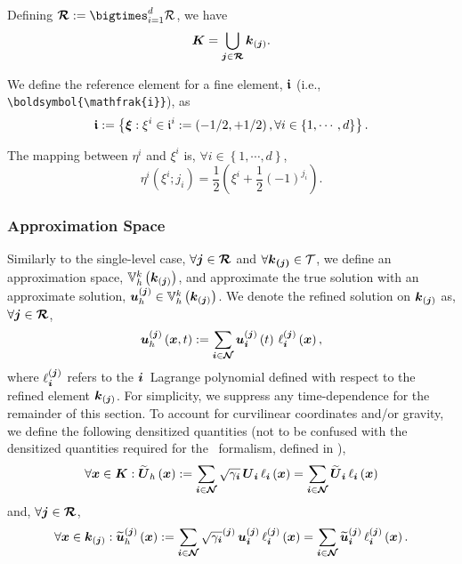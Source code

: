 Defining $\bc{R}:=\bigtimes_{i=1}^{d}\mc{R}$,
we have
\begin{equation}
  \boldsymbol{K}=\bigcup\limits_{\boldsymbol{j}\in\boldsymbol{\mathcal{R}}}
  \boldsymbol{k}_{\left(\boldsymbol{j}\right)}.
\end{equation}

We define the reference element for a fine element,
$\boldsymbol{\mathfrak{i}}$ (i.e., \verb"\boldsymbol{\mathfrak{i}}"), as
\begin{equation}
  \boldsymbol{\mathfrak{i}}
  :=\left\{\boldsymbol{\xi}:\xi^{i}\in\mathfrak{i}^{i}
  :=\left(-1/2,+1/2\right),\forall i\in\left\{1,\cdots,d\right\}\right\}.
\end{equation}

The mapping between $\eta^{i}$ and $\xi^{i}$ is,
$\forall i\in\left\{1,\cdots,d\right\}$,
\begin{equation}
  \eta^{i}\left(\xi^{i};j_{i}\right)
  =\frac{1}{2}\left(\xi^{i}+\frac{1}{2}\left(-1\right)^{j_{i}}\right).
\end{equation}

\subsubsection{Approximation Space}

Similarly to the single-level case,
$\forall \boldsymbol{j}\in\boldsymbol{\mathcal{R}}$
and $\forall\boldsymbol{\boldsymbol{k}_{\left(\boldsymbol{j}\right)}}\in\mathcal{T}$,
we define an approximation space,
$\mathbb{V}_{h}^{k}\left(\boldsymbol{k}_{\left(\boldsymbol{j}\right)}\right)$,
and approximate the true solution with an approximate solution,
$\boldsymbol{u}_{h}^{\left(\boldsymbol{j}\right)}
\in\mathbb{V}_{h}^{k}\left(\boldsymbol{k}_{\left(\boldsymbol{j}\right)}\right)$.
We denote the refined solution on $\boldsymbol{k}_{\left(\boldsymbol{j}\right)}$ as,
$\forall\boldsymbol{j}\in\boldsymbol{\mathcal{R}}$,
\begin{equation}
  \boldsymbol{u}^{\left(\boldsymbol{j}\right)}_{h}\left(\boldsymbol{x},t\right)
  :=\sum\limits_{\boldsymbol{i}\in\boldsymbol{\mathcal{N}}}
  \boldsymbol{u}^{\left(\boldsymbol{j}\right)}_{\boldsymbol{i}}\left(t\right)\,
  \ell^{\left(\boldsymbol{j}\right)}_{\boldsymbol{i}}\left(\boldsymbol{x}\right),
\end{equation}
where $\ell^{\left(\boldsymbol{j}\right)}_{\boldsymbol{i}}$ refers to the $\boldsymbol{i}$\myth\ Lagrange
polynomial defined with respect to the refined element
$\boldsymbol{k}_{\left(\boldsymbol{j}\right)}$.
For simplicity, we suppress any time-dependence for the remainder
of this section.
To account for curvilinear coordinates and/or gravity, we define
the following densitized quantities
(not to be confused with the densitized
quantities required for the \xcfc\ formalism, defined in
),
\begin{equation}
  \forall\boldsymbol{x}\in\boldsymbol{K}:\widetilde{\boldsymbol{U}}_{h}\left(\boldsymbol{x}\right)
  :=\sum\limits_{\boldsymbol{i}\in\boldsymbol{\mathcal{N}}}
  \sqrt{\gamma_{\boldsymbol{i}}}\,
  \boldsymbol{U}_{\boldsymbol{i}}\,\ell_{\boldsymbol{i}}\left(\boldsymbol{x}\right)
  =\sum\limits_{\boldsymbol{i}\in\boldsymbol{\mathcal{N}}}
  \widetilde{\boldsymbol{U}}_{\boldsymbol{i}}\,\ell_{\boldsymbol{i}}\left(\boldsymbol{x}\right)
  \label{eq.crseSoln}
\end{equation}
and, $\forall\boldsymbol{j}\in\boldsymbol{\mathcal{R}}$,
\begin{equation}
  \forall\boldsymbol{x}\in\boldsymbol{k}_{\left(\boldsymbol{j}\right)}:\widetilde{\boldsymbol{u}}^{\left(\boldsymbol{j}\right)}_{h}\left(\boldsymbol{x}\right)
  :=\sum\limits_{\boldsymbol{i}\in\boldsymbol{\mathcal{N}}}
  \sqrt{\gamma_{\boldsymbol{i}}}^{\left(\boldsymbol{j}\right)}\,
  \boldsymbol{u}^{\left(\boldsymbol{j}\right)}_{\boldsymbol{i}}\,
  \ell^{\left(\boldsymbol{j}\right)}_{\boldsymbol{i}}\left(\boldsymbol{x}\right)
  =\sum\limits_{\boldsymbol{i}\in\boldsymbol{\mathcal{N}}}
  \widetilde{\boldsymbol{u}}^{\left(\boldsymbol{j}\right)}_{\boldsymbol{i}}\,
  \ell^{\left(\boldsymbol{j}\right)}_{\boldsymbol{i}}\left(\boldsymbol{x}\right).
  \label{eq.refSoln}
\end{equation}

